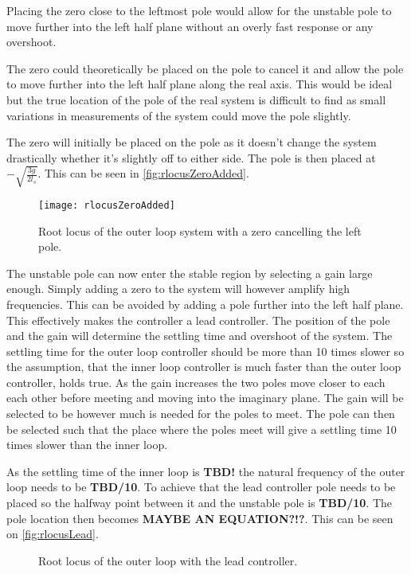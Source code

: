 Placing the zero close to the leftmost pole would allow for the unstable pole to move further into the left half plane without an overly fast response or any overshoot. 

The zero could theoretically be placed on the pole to cancel it and allow the pole to move further into the left half plane along the real axis. This would be ideal but the true location of the pole of the real system is difficult to find as small variations in measurements of the system could move the pole slightly. 

The zero will initially be placed on the pole as it doesn't change the system drastically whether it's slightly off to either side. The pole is then placed at $-\sqrt{\frac{3g}{2l_s}}$. This can be seen in \autoref{fig:rlocusZeroAdded}.

\begin{figure}[htbp]
\centering
\texttt{[image: rlocusZeroAdded]}
\caption{Root locus of the outer loop system with a zero cancelling the left pole.}
\label{fig:rlocusZeroAdded}
\end{figure}

The unstable pole can now enter the stable region by selecting a gain large enough. Simply adding a zero to the system will however amplify high frequencies. This can be avoided by adding a pole further into the left half plane. This effectively makes the controller a lead controller. The position of the pole and the gain will determine the settling time and overshoot of the system. The settling time for the outer loop controller should be more than 10 times slower so the assumption, that the inner loop controller is much faster than the outer loop controller, holds true. As the gain increases the two poles move closer to each each other before meeting and moving into the imaginary plane. The gain will be selected to be however much is needed for the poles to meet. The pole can then be selected such that the place where the poles meet will give a settling time 10 times slower than the inner loop.

As the settling time of the inner loop is \textbf{TBD!} the natural frequency of the outer loop needs to be \textbf{TBD/10}. To achieve that the lead controller pole needs to be placed so the halfway point between it and the unstable pole is \textbf{TBD/10}. The pole location then becomes \textbf{MAYBE AN EQUATION?!?}. This can be seen on \autoref{fig:rlocusLead}.
\begin{figure}[htbp]
\centering
\missingfigure{}
\caption{Root locus of the outer loop with the lead controller.}
\label{fig:rlocusLead}
\end{figure}

